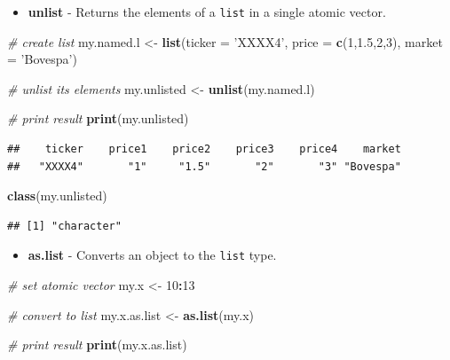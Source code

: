 \documentclass[11pt,]{book}
\newenvironment{Shaded}{\begin{snugshade}}{\end{snugshade}}
\newcommand{\KeywordTok}[1]{\textcolor[rgb]{0.27,0.27,0.27}{\textbf{#1}}}
\newcommand{\DataTypeTok}[1]{\textcolor[rgb]{0.27,0.27,0.27}{#1}}
\newcommand{\DecValTok}[1]{\textcolor[rgb]{0.06,0.06,0.06}{#1}}
\newcommand{\FloatTok}[1]{\textcolor[rgb]{0.06,0.06,0.06}{#1}}
\newcommand{\StringTok}[1]{\textcolor[rgb]{0.5,0.5,0.5}{#1}}
\newcommand{\CommentTok}[1]{\textcolor[rgb]{0.56,0.35,0.01}{\textit{#1}}}
\newcommand{\OperatorTok}[1]{\textcolor[rgb]{0.81,0.36,0.00}{\textbf{#1}}}
\newcommand{\NormalTok}[1]{#1}
\providecommand{\tightlist}{%
  \setlength{\itemsep}{0pt}\setlength{\parskip}{0pt}}
\begin{document}
\begin{itemize}
\tightlist
\item
  \textbf{unlist} - Returns the elements of a \texttt{list} in a single
  atomic vector. 
\end{itemize}

\begin{Shaded}
\begin{Highlighting}[]
\CommentTok{# create list}
\NormalTok{my.named.l <-}\StringTok{ }\KeywordTok{list}\NormalTok{(}\DataTypeTok{ticker =} \StringTok{'XXXX4'}\NormalTok{, }
                   \DataTypeTok{price =} \KeywordTok{c}\NormalTok{(}\DecValTok{1}\NormalTok{,}\FloatTok{1.5}\NormalTok{,}\DecValTok{2}\NormalTok{,}\DecValTok{3}\NormalTok{), }
                   \DataTypeTok{market =} \StringTok{'Bovespa'}\NormalTok{)}

\CommentTok{# unlist its elements                  }
\NormalTok{my.unlisted <-}\StringTok{ }\KeywordTok{unlist}\NormalTok{(my.named.l)}

\CommentTok{# print result}
\KeywordTok{print}\NormalTok{(my.unlisted)}
\end{Highlighting}
\end{Shaded}

\begin{verbatim}
##    ticker    price1    price2    price3    price4    market 
##   "XXXX4"       "1"     "1.5"       "2"       "3" "Bovespa"
\end{verbatim}

\begin{Shaded}
\begin{Highlighting}[]
\KeywordTok{class}\NormalTok{(my.unlisted)}
\end{Highlighting}
\end{Shaded}

\begin{verbatim}
## [1] "character"
\end{verbatim}

\begin{itemize}
\tightlist
\item
  \textbf{as.list} - Converts an object to the \texttt{list} type.
\end{itemize}

\begin{Shaded}
\begin{Highlighting}[]
\CommentTok{# set atomic vector}
\NormalTok{my.x <-}\StringTok{ }\DecValTok{10}\OperatorTok{:}\DecValTok{13}

\CommentTok{# convert to list}
\NormalTok{my.x.as.list <-}\StringTok{ }\KeywordTok{as.list}\NormalTok{(my.x)}

\CommentTok{# print result}
\KeywordTok{print}\NormalTok{(my.x.as.list)}
\end{Highlighting}
\end{Shaded}
\end{document}
